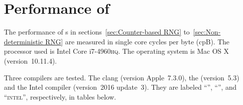 %
%
%
%

\chapter{Performance of \texorpdfstring{}{RNG}}
\label{chap:Performance of RNG}

The performance of \rng{}s in sections~\ref{sec:Counter-based RNG}
to~\ref{sec:Non-deterministic RNG} are measured in single core cycles per byte
(cpB). The processor used is Intel Core i7-4960\textsc{hq}. The operating
system is Mac OS X (version~10.11.4).

Three compilers are tested. The \llvm clang (version Apple~7.3.0), the \gnu{}
\gcc (version~5.3) and the Intel \cpp compiler (version~2016 update~3). They
are labeled ``\llvm'', ``\gcc'', and ``\textsc{intel}'', respectively, in
tables below.

